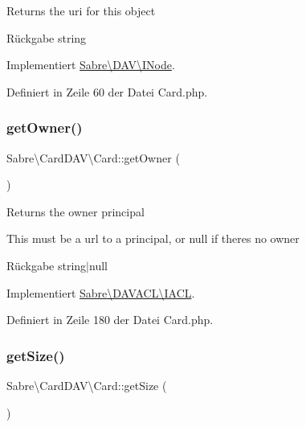 Returns the uri for this object

\begin{DoxyReturn}{Rückgabe}
string 
\end{DoxyReturn}


Implementiert \mbox{\hyperlink{interface_sabre_1_1_d_a_v_1_1_i_node_ab616fe836b1ae36af12126a2bc934dce}{Sabre\textbackslash{}\+D\+A\+V\textbackslash{}\+I\+Node}}.



Definiert in Zeile 60 der Datei Card.\+php.

\mbox{\label{class_sabre_1_1_card_d_a_v_1_1_card_aed3e88c557d1bf6b1dfd75b02bad3fbc}} 
\subsubsection{\texorpdfstring{get\+Owner()}{getOwner()}}
{\footnotesize\ttfamily Sabre\textbackslash{}\+Card\+D\+A\+V\textbackslash{}\+Card\+::get\+Owner (\begin{DoxyParamCaption}{ }\end{DoxyParamCaption})}

Returns the owner principal

This must be a url to a principal, or null if there\textquotesingle{}s no owner

\begin{DoxyReturn}{Rückgabe}
string$\vert$null 
\end{DoxyReturn}


Implementiert \mbox{\hyperlink{interface_sabre_1_1_d_a_v_a_c_l_1_1_i_a_c_l_a05f531b4ae1a86eab4e6e95b0413390e}{Sabre\textbackslash{}\+D\+A\+V\+A\+C\+L\textbackslash{}\+I\+A\+CL}}.



Definiert in Zeile 180 der Datei Card.\+php.

\mbox{\label{class_sabre_1_1_card_d_a_v_1_1_card_aea671f67af75006c2845565d8a55599e}} 
\subsubsection{\texorpdfstring{get\+Size()}{getSize()}}
{\footnotesize\ttfamily Sabre\textbackslash{}\+Card\+D\+A\+V\textbackslash{}\+Card\+::get\+Size (\begin{DoxyParamCaption}{ }\end{DoxyParamCaption})}

